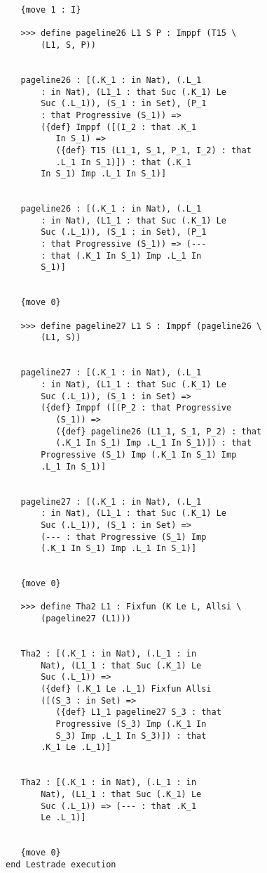 \documentclass{article}
\begin{document}
\begin{verbatim}
   {move 1 : I}

   >>> define pageline26 L1 S P : Imppf (T15 \
       (L1, S, P))


   pageline26 : [(.K_1 : in Nat), (.L_1 
       : in Nat), (L1_1 : that Suc (.K_1) Le 
       Suc (.L_1)), (S_1 : in Set), (P_1 
       : that Progressive (S_1)) => 
       ({def} Imppf ([(I_2 : that .K_1 
          In S_1) => 
          ({def} T15 (L1_1, S_1, P_1, I_2) : that 
          .L_1 In S_1)]) : that (.K_1 
       In S_1) Imp .L_1 In S_1)]


   pageline26 : [(.K_1 : in Nat), (.L_1 
       : in Nat), (L1_1 : that Suc (.K_1) Le 
       Suc (.L_1)), (S_1 : in Set), (P_1 
       : that Progressive (S_1)) => (--- 
       : that (.K_1 In S_1) Imp .L_1 In 
       S_1)]


   {move 0}

   >>> define pageline27 L1 S : Imppf (pageline26 \
       (L1, S))


   pageline27 : [(.K_1 : in Nat), (.L_1 
       : in Nat), (L1_1 : that Suc (.K_1) Le 
       Suc (.L_1)), (S_1 : in Set) => 
       ({def} Imppf ([(P_2 : that Progressive 
          (S_1)) => 
          ({def} pageline26 (L1_1, S_1, P_2) : that 
          (.K_1 In S_1) Imp .L_1 In S_1)]) : that 
       Progressive (S_1) Imp (.K_1 In S_1) Imp 
       .L_1 In S_1)]


   pageline27 : [(.K_1 : in Nat), (.L_1 
       : in Nat), (L1_1 : that Suc (.K_1) Le 
       Suc (.L_1)), (S_1 : in Set) => 
       (--- : that Progressive (S_1) Imp 
       (.K_1 In S_1) Imp .L_1 In S_1)]


   {move 0}

   >>> define Tha2 L1 : Fixfun (K Le L, Allsi \
       (pageline27 (L1)))


   Tha2 : [(.K_1 : in Nat), (.L_1 : in 
       Nat), (L1_1 : that Suc (.K_1) Le 
       Suc (.L_1)) => 
       ({def} (.K_1 Le .L_1) Fixfun Allsi 
       ([(S_3 : in Set) => 
          ({def} L1_1 pageline27 S_3 : that 
          Progressive (S_3) Imp (.K_1 In 
          S_3) Imp .L_1 In S_3)]) : that 
       .K_1 Le .L_1)]


   Tha2 : [(.K_1 : in Nat), (.L_1 : in 
       Nat), (L1_1 : that Suc (.K_1) Le 
       Suc (.L_1)) => (--- : that .K_1 
       Le .L_1)]


   {move 0}
end Lestrade execution
\end{verbatim}
\end{document}
